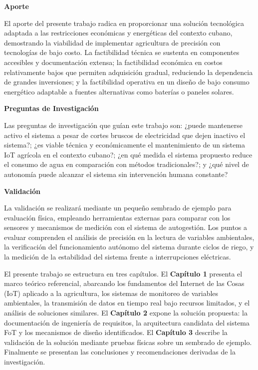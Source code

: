 \bigskip
\noindent\textbf{Aporte}

\noindent El aporte del presente trabajo radica en proporcionar una solución tecnológica adaptada a las restricciones económicas y energéticas del contexto cubano, demostrando la viabilidad de implementar agricultura de precisión con tecnologías de bajo costo. La factibilidad técnica se sustenta en componentes accesibles y documentación extensa; la factibilidad económica en costos relativamente bajos que permiten adquisición gradual, reduciendo la dependencia de grandes inversiones; y la factibilidad operativa en un diseño de bajo consumo energético adaptable a fuentes alternativas como baterías o paneles solares.

\bigskip
\noindent\textbf{Preguntas de Investigación}

\noindent Las preguntas de investigación que guían este trabajo son: ¿puede mantenerse activo el sistema a pesar de cortes bruscos de electricidad que dejen inactivo el sistema?; ¿es viable técnica y económicamente el mantenimiento de un sistema IoT agrícola en el contexto cubano?; ¿en qué medida el sistema propuesto reduce el consumo de agua en comparación con métodos tradicionales?; y ¿qué nivel de autonomía puede alcanzar el sistema sin intervención humana constante?

\bigskip
\noindent\textbf{Validación}

\noindent La validación se realizará mediante un pequeño sembrado de ejemplo para evaluación física, empleando herramientas externas para comparar con los sensores y mecanismos de medición con el sistema de autogestión. Los puntos a evaluar comprenden el análisis de precisión en la lectura de variables ambientales, la verificación del funcionamiento autónomo del sistema durante ciclos de riego, y la medición de la estabilidad del sistema frente a interrupciones eléctricas.

\bigskip
\noindent El presente trabajo se estructura en tres capítulos. El \textbf{Capítulo 1} presenta el marco teórico referencial, abarcando los fundamentos del Internet de las Cosas (IoT) aplicado a la agricultura, los sistemas de monitoreo de variables ambientales, la transmisión de datos en tiempo real bajo recursos limitados, y el análisis de soluciones similares. El \textbf{Capítulo 2} expone la solución propuesta: la documentación de ingeniería de requisitos, la arquitectura candidata del sistema FoT y los mecanismos de diseño identificados. El \textbf{Capítulo 3} describe la validación de la solución mediante pruebas físicas sobre un sembrado de ejemplo. Finalmente se presentan las conclusiones y recomendaciones derivadas de la investigación.